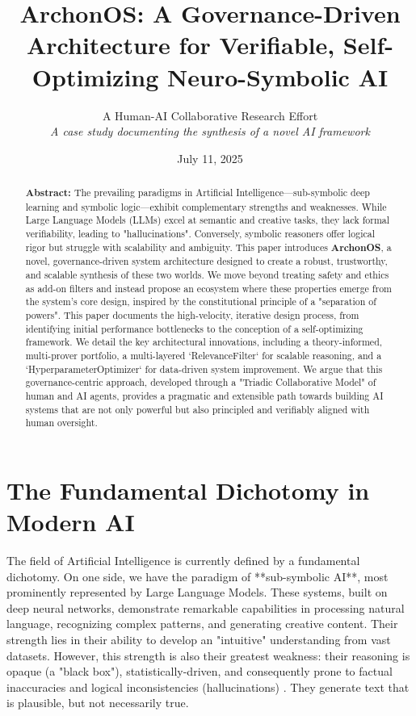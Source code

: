 \documentclass[11pt, a4paper]{article}
\title{\textbf{ArchonOS: A Governance-Driven Architecture for Verifiable, Self-Optimizing Neuro-Symbolic AI}\\[1cm]}
\author{
    A Human-AI Collaborative Research Effort \\
    \small{\textit{A case study documenting the synthesis of a novel AI framework}}
}
\date{July 11, 2025}
\begin{document}
\maketitle
\thispagestyle{empty}

\begin{abstract}
\noindent \textbf{Abstract:} The prevailing paradigms in Artificial Intelligence—sub-symbolic deep learning and symbolic logic—exhibit complementary strengths and weaknesses. While Large Language Models (LLMs) excel at semantic and creative tasks, they lack formal verifiability, leading to "hallucinations". Conversely, symbolic reasoners offer logical rigor but struggle with scalability and ambiguity. This paper introduces \textbf{ArchonOS}, a novel, governance-driven system architecture designed to create a robust, trustworthy, and scalable synthesis of these two worlds. We move beyond treating safety and ethics as add-on filters and instead propose an ecosystem where these properties emerge from the system's core design, inspired by the constitutional principle of a "separation of powers". This paper documents the high-velocity, iterative design process, from identifying initial performance bottlenecks to the conception of a self-optimizing framework. We detail the key architectural innovations, including a theory-informed, multi-prover portfolio, a multi-layered `RelevanceFilter` for scalable reasoning, and a `HyperparameterOptimizer` for data-driven system improvement. We argue that this governance-centric approach, developed through a "Triadic Collaborative Model" of human and AI agents, provides a pragmatic and extensible path towards building AI systems that are not only powerful but also principled and verifiably aligned with human oversight.
\end{abstract}

\tableofcontents
\newpage

\section{The Fundamental Dichotomy in Modern AI}
\label{sec:challenge}

The field of Artificial Intelligence is currently defined by a fundamental dichotomy. On one side, we have the paradigm of **sub-symbolic AI**, most prominently represented by Large Language Models. These systems, built on deep neural networks, demonstrate remarkable capabilities in processing natural language, recognizing complex patterns, and generating creative content. Their strength lies in their ability to develop an "intuitive" understanding from vast datasets. However, this strength is also their greatest weakness: their reasoning is opaque (a "black box"), statistically-driven, and consequently prone to factual inaccuracies and logical inconsistencies (hallucinations) \cite{nesy_review}. They generate text that is plausible, but not necessarily true.
\end{document}
